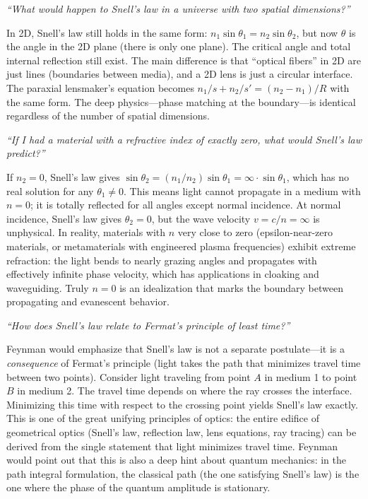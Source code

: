 \textit{``What would happen to Snell's law in a universe with two spatial dimensions?''}

In 2D, Snell's law still holds in the same form: $n_1\sin\theta_1 = n_2\sin\theta_2$, but now $\theta$ is the angle in the 2D plane (there is only one plane). The critical angle and total internal reflection still exist. The main difference is that ``optical fibers'' in 2D are just lines (boundaries between media), and a 2D lens is just a circular interface. The paraxial lensmaker's equation becomes $n_1/s + n_2/s' = (n_2 - n_1)/R$ with the same form. The deep physics---phase matching at the boundary---is identical regardless of the number of spatial dimensions.

\textit{``If I had a material with a refractive index of exactly zero, what would Snell's law predict?''}

If $n_2 = 0$, Snell's law gives $\sin\theta_2 = (n_1/n_2)\sin\theta_1 = \infty \cdot \sin\theta_1$, which has no real solution for any $\theta_1 \neq 0$. This means light cannot propagate in a medium with $n = 0$; it is totally reflected for all angles except normal incidence. At normal incidence, Snell's law gives $\theta_2 = 0$, but the wave velocity $v = c/n = \infty$ is unphysical. In reality, materials with $n$ very close to zero (epsilon-near-zero materials, or metamaterials with engineered plasma frequencies) exhibit extreme refraction: the light bends to nearly grazing angles and propagates with effectively infinite phase velocity, which has applications in cloaking and waveguiding. Truly $n = 0$ is an idealization that marks the boundary between propagating and evanescent behavior.

\textit{``How does Snell's law relate to Fermat's principle of least time?''}

Feynman would emphasize that Snell's law is not a separate postulate---it is a \emph{consequence} of Fermat's principle (light takes the path that minimizes travel time between two points). Consider light traveling from point $A$ in medium 1 to point $B$ in medium 2. The travel time depends on where the ray crosses the interface. Minimizing this time with respect to the crossing point yields Snell's law exactly. This is one of the great unifying principles of optics: the entire edifice of geometrical optics (Snell's law, reflection law, lens equations, ray tracing) can be derived from the single statement that light minimizes travel time. Feynman would point out that this is also a deep hint about quantum mechanics: in the path integral formulation, the classical path (the one satisfying Snell's law) is the one where the phase of the quantum amplitude is stationary.

